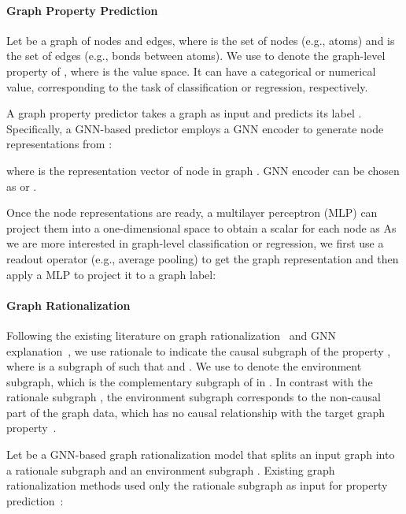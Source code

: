 \documentclass[sigconf]{acmart}
\begin{document}
\paragraph{Graph Property Prediction}
Let  be a graph of  nodes and  edges, where  is the set of nodes (e.g., atoms) and  is the set of edges (e.g., bonds between atoms). We use  to denote the graph-level property of , where  is the value space. It can have a categorical or numerical value, corresponding to the task of classification or regression, respectively.

A graph property predictor  takes a graph  as input and predicts its label . Specifically, a GNN-based predictor employs a GNN encoder to generate node representations  from :

where  is the representation vector of node  in graph . GNN encoder  can be chosen as \gcn \cite{kipf2017semi} or \gin \cite{xu2018how}.

Once the node representations are ready, a multilayer perceptron (MLP) can project them into a one-dimensional space to obtain a scalar for each node as 
As we are more interested in graph-level classification or regression, we first use a readout operator (e.g., average pooling) to get the graph representation  and then apply a MLP to project it to a graph label:



\paragraph{Graph Rationalization}
Following the existing literature on graph rationalization~\cite{ying2018hierarchical,lee2019self,gao2021graph,fan2021generalizing,wu2022discovering} and GNN explanation~\cite{ying2019gnnexplainer}, we use rationale  to indicate the causal subgraph of the property , where  is a subgraph of  such that  and . We use  to denote the environment subgraph, which is the complementary subgraph of  in .
In contrast with the rationale subgraph , the environment subgraph  corresponds to the non-causal part of the graph data, which has no causal relationship with the target graph property~\cite{chang2020invariant,wu2022discovering}.

Let  be a GNN-based graph rationalization model that splits an input graph  into a rationale subgraph  and an environment subgraph . Existing graph rationalization methods used only the rationale subgraph as input for property prediction~\cite{lee2019self,ying2018hierarchical,gao2021graph,wu2022discovering}:
\end{document}
